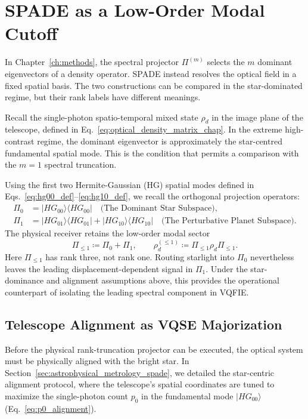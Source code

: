 \section{SPADE as a Low-Order Modal Cutoff}

In Chapter~\ref{ch:methods}, the spectral projector $\Pi^{(m)}$ selects the $m$ dominant eigenvectors of a density operator. SPADE instead resolves the optical field in a fixed spatial basis. The two constructions can be compared in the star-dominated regime, but their rank labels have different meanings.

Recall the single-photon spatio-temporal mixed state $\rho_d$ in the image plane of the telescope, defined in Eq.~\eqref{eq:optical_density_matrix_chap}. In the extreme high-contrast regime, the dominant eigenvector is approximately the star-centred fundamental spatial mode. This is the condition that permits a comparison with the $m=1$ spectral truncation.

Using the first two Hermite-Gaussian (HG) spatial modes defined in Eqs.~\eqref{eq:hg00_def}--\eqref{eq:hg10_def}, we recall the orthogonal projection operators:
\begin{align}
    \Pi_0 & = |HG_{00}\rangle\langle HG_{00}| \quad \text{(The Dominant Star Subspace)},                                         \\
    \Pi_1 & = |HG_{01}\rangle\langle HG_{01}| + |HG_{10}\rangle\langle HG_{10}| \quad \text{(The Perturbative Planet Subspace)}.
\end{align}
The physical receiver retains the low-order modal sector
\begin{equation}
    \Pi_{\leq 1} \coloneqq \Pi_0 + \Pi_1, \qquad
    \rho_d^{(\leq 1)} \coloneqq \Pi_{\leq 1}\rho_d\Pi_{\leq 1}.
    \label{eq:physical_modal_cutoff}
\end{equation}
Here $\Pi_{\leq1}$ has rank three, not rank one. Routing starlight into $\Pi_0$ nevertheless leaves the leading displacement-dependent signal in $\Pi_1$. Under the star-dominance and alignment assumptions above, this provides the operational counterpart of isolating the leading spectral component in VQFIE.

\subsection{Telescope Alignment as VQSE Majorization}
Before the physical rank-truncation projector can be executed, the optical system must be physically aligned with the bright star. In Section~\ref{sec:astrophysical_metrology_spade}, we detailed the star-centric alignment protocol, where the telescope's spatial coordinates are tuned to maximize the single-photon count $p_0$ in the fundamental mode $|HG_{00}\rangle$ (Eq.~\eqref{eq:p0_alignment}).

